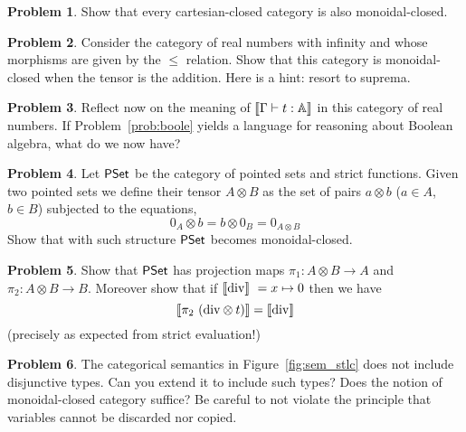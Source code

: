 \documentclass[a4paper, 11pt]{article}
\theoremstyle{definition}
\newtheorem{problem}{Problem}
\begin{document}
\begin{problem}
        Show that every cartesian-closed category is also monoidal-closed.
\end{problem}

\begin{problem}
        Consider the category of real numbers with infinity and whose morphisms
        are given by the $\leq$ relation. Show that this category is
        monoidal-closed when the tensor is the addition. Here is a hint: resort
        to suprema.
\end{problem}

\begin{problem}
Reflect now on the meaning of $\llbracket \Gamma \vdash t : \mathbb{A} \rrbracket$ in this category
of real numbers. If Problem~\eqref{prob:boole} yields a language for reasoning
about Boolean algebra, what do we now have?
\end{problem}

\newcommand{\PSet}{\catfont{PSet}}
\begin{problem}
        Let $\PSet$ be the category of pointed sets and strict functions. Given
        two pointed sets we define their tensor $A \otimes B$ as the set of
        pairs $a \otimes b$ ($a \in A$, $b \in B$) subjected to the equations,
        \[
                0_A \otimes b = b \otimes 0_B = 0_{A \otimes B}
        \]
        Show that with such structure $\PSet$ becomes monoidal-closed.
\end{problem}

\begin{problem}
        Show that $\PSet$ has projection maps $\pi_1 : A \otimes B \to A$ and
        $\pi_2 : A \otimes B \to B$. Moreover show that if
        $\llbracket \mathrm{div} \rrbracket\ = x \mapsto 0$ then we have
        \[
                \sem{ \pi_2\ (\mathrm{div} \otimes t) } = \sem{ \mathrm{div} }
        \]
        (precisely as expected from strict evaluation!)
\end{problem}

\begin{problem}
        The categorical semantics in Figure~\ref{fig:sem_stlc} does not include
        disjunctive types. Can you extend it to include such types? Does the
        notion of monoidal-closed category suffice? Be careful to not violate
        the principle that variables cannot be discarded nor copied.
\end{problem}
      
\end{document}
